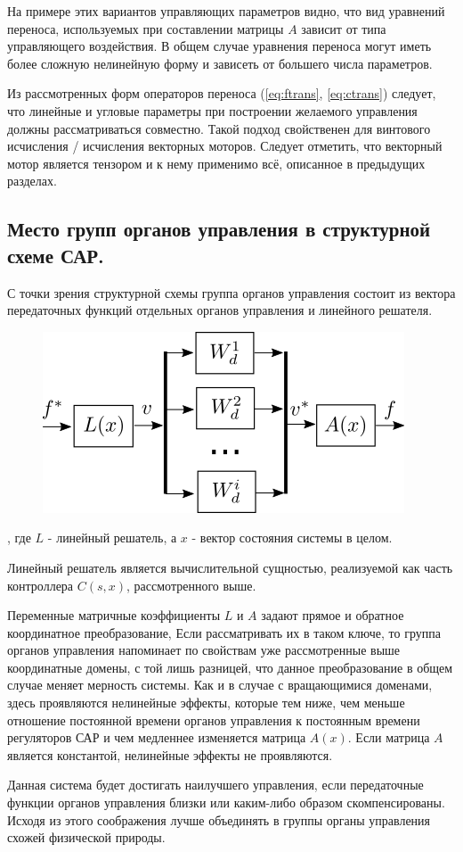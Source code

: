 На примере этих вариантов управляющих параметров видно, что вид уравнений переноса, используемых при составлении матрицы $A$ зависит от типа управляющего воздействия. В общем случае уравнения переноса могут иметь более сложную нелинейную форму и зависеть от большего числа параметров. 

Из рассмотренных форм операторов переноса (\ref{eq:ftrans}, \ref{eq:ctrans}) следует, что линейные и угловые параметры при построении желаемого управления должны рассматриваться совместно. Такой подход свойственен для винтового исчисления / исчисления векторных моторов. Следует отметить, что векторный мотор является тензором и к нему применимо всё, описанное в предыдущих разделах.  

\subsection{Место групп органов управления в структурной схеме САР.}
С точки зрения структурной схемы группа органов управления состоит из вектора передаточных функций отдельных органов управления и линейного решателя.

{
\begin{figure}[H]
\centering
\includegraphics{./src/slau.png}
\end{figure}
}

, где $L$ - линейный решатель, а $x$ - вектор состояния системы в целом. 

Линейный решатель является вычислительной сущностью, реализуемой как часть контроллера $C(s,x)$, рассмотренного выше.

Переменные матричные коэффициенты $L$ и $A$ задают прямое и обратное координатное преобразование, Если рассматривать их в таком ключе, то группа органов управления напоминает по свойствам уже рассмотренные выше координатные домены, с той лишь разницей, что данное преобразование в общем случае меняет мерность системы. Как и в случае с вращающимися доменами, здесь проявляются нелинейные эффекты, которые тем ниже, чем меньше отношение постоянной времени органов управления к постоянным времени регуляторов САР и чем медленнее изменяется матрица $A(x)$. Если матрица $A$ является константой, нелинейные эффекты не проявляются. 

Данная система будет достигать наилучшего управления, если передаточные функции органов управления близки или каким-либо образом скомпенсированы. Исходя из этого соображения лучше объединять в группы органы управления схожей физической природы.